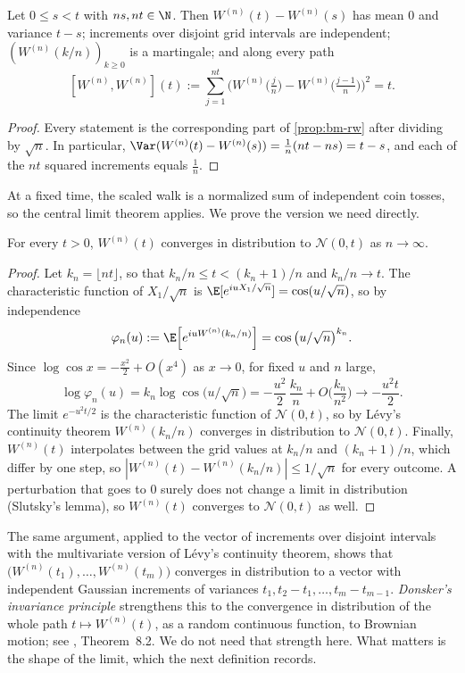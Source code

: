 \begin{proposition}\label{prop:bm-scaled}
Let $0\le s<t$ with $ns,nt\in\N$. Then $W^{(n)}(t)-W^{(n)}(s)$ has mean $0$ and
variance $t-s$; increments over disjoint grid intervals are independent;
$(W^{(n)}(k/n))_{k\ge0}$ is a martingale; and along every path
\[
  [W^{(n)},W^{(n)}](t):=\sum_{j=1}^{nt}\Big(W^{(n)}\big(\tfrac jn\big)-W^{(n)}\big(\tfrac{j-1}n\big)\Big)^2=t .
\]
\end{proposition}

\begin{proof}
Every statement is the corresponding part of \cref{prop:bm-rw} after dividing by
$\sqrt n$. In particular, $\Var(W^{(n)}(t)-W^{(n)}(s))=\frac1n(nt-ns)=t-s$, and each of
the $nt$ squared increments equals $\frac1n$.
\end{proof}

At a fixed time, the scaled walk is a normalized sum of independent coin tosses, so the
central limit theorem applies. We prove the version we need directly.

\begin{theorem}\label{thm:bm-clt}
For every $t>0$, $W^{(n)}(t)$ converges in distribution to $\mathcal N(0,t)$ as
$n\to\infty$.
\end{theorem}

\begin{proof}
Let $k_n=\lfloor nt\rfloor$, so that $k_n/n\le t<(k_n+1)/n$ and $k_n/n\to t$. The
characteristic function of $X_1/\sqrt n$ is $\E[e^{iuX_1/\sqrt n}]=\cos(u/\sqrt n)$, so by
independence
\[
  \varphi_n(u):=\E\Big[e^{iuW^{(n)}(k_n/n)}\Big]=\cos\big(u/\sqrt n\big)^{k_n}.
\]
Since $\log\cos x=-\tfrac{x^2}{2}+O(x^4)$ as $x\to0$, for fixed $u$ and $n$ large,
\[
  \log\varphi_n(u)=k_n\log\cos\big(u/\sqrt n\big)=-\frac{u^2}{2}\,\frac{k_n}{n}+O\Big(\frac{k_n}{n^2}\Big)
  \longrightarrow-\frac{u^2t}{2}.
\]
The limit $e^{-u^2t/2}$ is the characteristic function of $\mathcal N(0,t)$, so by Lévy's
continuity theorem $W^{(n)}(k_n/n)$ converges in distribution to $\mathcal N(0,t)$.
Finally, $W^{(n)}(t)$ interpolates between the grid values at $k_n/n$ and $(k_n+1)/n$,
which differ by one step, so $|W^{(n)}(t)-W^{(n)}(k_n/n)|\le1/\sqrt n$ for every outcome.
A perturbation that goes to $0$ surely does not change a limit in distribution
(Slutsky's lemma), so $W^{(n)}(t)$ converges to $\mathcal N(0,t)$ as well.
\end{proof}

The same argument, applied to the vector of increments over disjoint intervals with the
multivariate version of Lévy's continuity theorem, shows
that $\big(W^{(n)}(t_1),\dots,W^{(n)}(t_m)\big)$ converges in distribution to a vector
with independent Gaussian increments of variances $t_1,t_2-t_1,\dots,t_m-t_{m-1}$.
\emph{Donsker's invariance principle} strengthens this to the convergence in distribution
of the whole path $t\mapsto W^{(n)}(t)$, as a random continuous function, to Brownian
motion; see \textcite{billingsley}, Theorem~8.2. We do not need that strength here. What
matters is the shape of the limit, which the next definition records.

